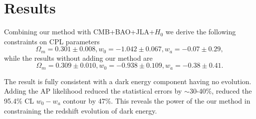 \documentclass[useAMS,usenatbib]{mnras}
\begin{document}




\section{Results}


Combining our method with CMB+BAO+JLA+$H_0$ we derive the following constraints on CPL parameters
\begin{equation}
\Omega_m = 0.301 \pm 0.008, w_0 = -1.042 \pm 0.067, w_a = -0.07 \pm 0.29,    
\end{equation}
while the results without adding our method are
\begin{equation}
\Omega_m = 0.309 \pm 0.010, w_0 = -0.938 \pm 0.109, w_a = -0.38 \pm 0.41.
\end{equation}


The result is fully consistent with a dark energy component having no evolution.
Adding the AP likelihood reduced the statistical errors by $\sim$30-40\%,
reduced the 95.4\% CL $w_0-w_a$ contour by 47\%.
This reveals the power of the our method in constraining the redshift evolution of dark energy.
\end{document}
